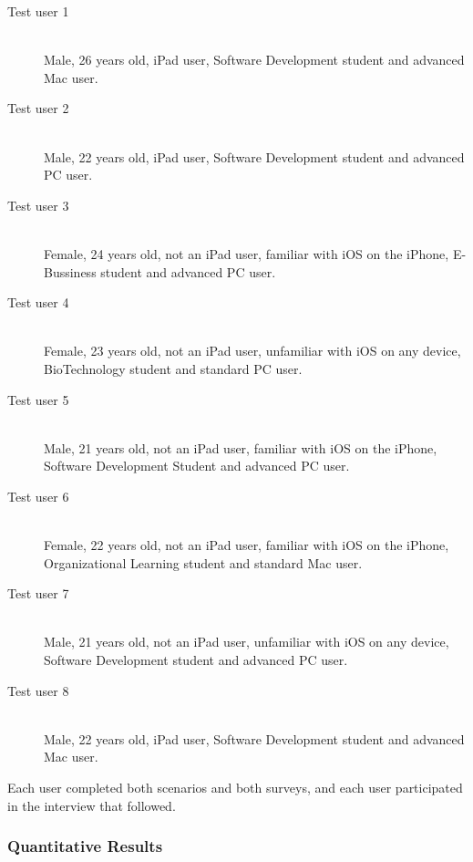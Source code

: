 \begin{description}

\item[Test user 1] \hfill \\
	Male, 26 years old, iPad user, Software Development student and advanced Mac user.
\item[Test user 2] \hfill \\
	Male, 22 years old, iPad user, Software Development student and advanced PC user.
\item[Test user 3] \hfill \\
	Female, 24 years old, not an iPad user, familiar with iOS on the iPhone, E-Bussiness student and advanced PC user.
\item[Test user 4] \hfill \\
	Female, 23 years old, not an iPad user, unfamiliar with iOS on any device, BioTechnology student and standard PC user.
\item[Test user 5] \hfill \\
	Male, 21 years old, not an iPad user, familiar with iOS on the iPhone, Software Development Student and advanced PC user.
\item[Test user 6] \hfill \\
	Female, 22 years old, not an iPad user, familiar with iOS on the iPhone, Organizational Learning student and standard Mac user.
\item[Test user 7] \hfill \\
	Male, 21 years old, not an iPad user, unfamiliar with iOS on any device, Software Development student and advanced PC user.
\item[Test user 8] \hfill \\
	Male, 22 years old, iPad user, Software Development student and advanced Mac user.
\end{description}

Each user completed both scenarios and both surveys, and each user participated in the interview that followed.

\subsubsection{Quantitative Results}

